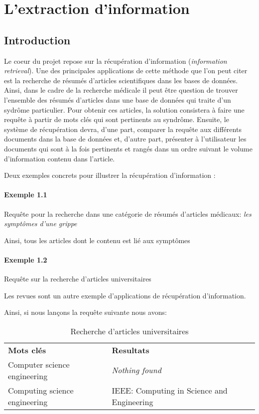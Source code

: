 \section{L'extraction d'information}

\subsection{Introduction}

Le coeur du projet repose sur la récupération d'information
({\it information retrieval}).
Une des principales applications de cette méthode
que l'on peut citer est la recherche de résumés
d'articles scientifiques dans les bases de données.
Ainsi, dans le cadre de la recherche médicale il peut être
question de trouver l'ensemble des résumés d'articles dans une
base de données qui traite d'un sydrôme particulier.
Pour obtenir ces articles, la solution consistera à faire une requête
à partir de mots clés qui sont pertinents au syndrôme.
Ensuite, le système de récupération devra, d'une part,
comparer la requête aux différents documents dans la base de données
et, d'autre part, présenter à l'utilisateur les documents qui sont
à la fois pertinents et rangés dans un ordre suivant
le volume d'information contenu dans l'article.

Deux exemples concrets pour illustrer la récupération d'information :

\paragraph{Exemple 1.1}
Requête pour la recherche dans une catégorie de résumés
d'articles médicaux: {\it les symptômes d'une grippe}

Ainsi, tous les articles dont le contenu est lié aux symptômes

\paragraph{Exemple 1.2}
Requête sur la recherche d'articles universitaires

Les revues sont un autre exemple d'applications
de récupération d'information.

Ainsi, si nous lançons la requête suivante nous avons:

\begin{table}[!htb]
\begin{center}
\begin{tabular}{l p{6cm}}
\bf Mots clés & \bf Resultats \\
Computer science engineering  & \it Nothing found \\
Computing science engineering
& IEEE: Computing in Science and Engineering
\end{tabular}
\caption{Recherche d'articles universitaires}
\end{center}
\end{table}

